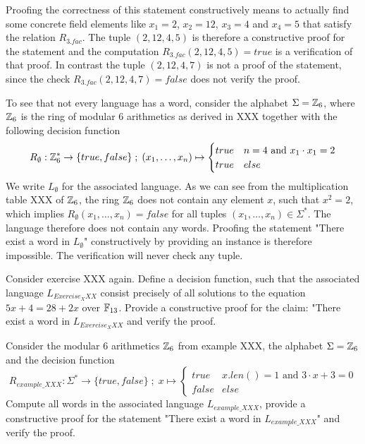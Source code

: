 \begin{example}[3-Factorization]
Proofing the correctness of this statement constructively means to actually find some concrete field elements like $x_1= 2$, $x_2 =12$, $x_3=4$ and $x_4 = 5$ that satisfy the relation $R_{3.fac}$. The tuple $(2,12,4,5)$ is therefore a constructive proof for the statement and the computation $R_{3.fac}(2,12,4,5)=true$ is a verification  of that proof. In contrast the tuple $(2, 12, 4, 7)$ is not a proof of the statement, since the check $R_{3.fac}(2,12,4,7)=false$ does not verify the proof.
\begin{example} To see that not every language has a word, consider the alphabet $\Sigma = \mathbb{Z}_6$, where $\mathbb{Z}_6$ is the ring of modular $6$ arithmetics as derived in XXX together with the following decision function 
$$
R_{\emptyset} : \mathbb{Z}_{6}^* \to \{true, false\}\;;\;
(x_1,\ldots,x_n) \mapsto
\begin{cases}
true & n=4 \text{ and } x_1\cdot x_1 = 2\\
true & else
\end{cases}
$$
We write $L_\emptyset$ for the associated language. As we can see from the multiplication table XXX of $\mathbb{Z}_6$, the ring $\mathbb{Z}_6$ does not contain any element $x$, such that $x^2 =2$, which implies $R_{\emptyset}(x_1,\ldots,x_n)=false$ for all tuples $(x_1,\ldots,x_n)\in \Sigma^*$. The language therefore does not contain any words. Proofing the statement "There exist a word in $L_\emptyset$" constructively by providing an instance is therefore impossible. The verification will never check any tuple.
\end{example}
\end{example}
\begin{exercise} Consider exercise XXX again. Define a decision function, such that the associated language $L_{Exercise_XXX}$ consist precisely of all solutions to the equation $5x + 4 = 28 + 2x$ over $\mathbb{F}_{13}$. Provide a constructive proof for the claim: "There exist a word in $L_{Exercise_XXX}$ and verify the proof.  
\end{exercise}
\begin{exercise} Consider the modular $6$ arithmetics $\mathbb{Z}_6$ from example XXX, the alphabet $\Sigma = \mathbb{Z}_6$ and the decision function
\begin{equation*}
R_{example\_XXX} : \Sigma^*\to \{true, false\}\;;\;
x \mapsto
\begin{cases}
true & x.len()=1 \text{ and } 3\cdot x + 3 = 0\\
false & else
\end{cases}
\end{equation*}
Compute all words in the associated language $L_{example\_XXX}$, provide a constructive proof for the statement "There exist a word in $L_{example\_XXX}$" and verify the proof.
\end{exercise}
